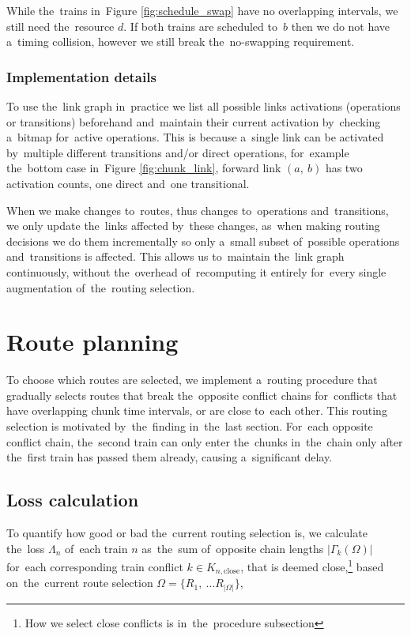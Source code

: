 \begin{remark}
While the~trains in~Figure \ref{fig:schedule_swap} have no overlapping intervals, we still need the~resource $d$. If both trains are scheduled to~$b$ then we do not have a~timing collision, however we still break the~no-swapping requirement.
\end{remark}

\subsubsection{Implementation details}
To use the~link graph in~practice we list all possible links activations (operations or transitions) beforehand and~maintain their current activation by~checking a~bitmap for~active operations. This is because a~single link can be activated by~multiple different transitions and/or direct operations, for~example the~bottom case in~Figure \ref{fig:chunk_link}, forward link $(a,\ b)$ has two activation counts, one direct and~one transitional.

When we make changes to~routes, thus changes to~operations and~transitions, we only update the~links affected by~these changes, as~when making routing decisions we do them incrementally so only a~small subset of~possible operations and~transitions is affected. This allows us to~maintain the~link graph continuously, without the~overhead of~recomputing it entirely for~every single augmentation of~the~routing selection.


\section{Route planning}
To choose which routes are selected, we implement a~routing procedure that gradually selects routes that break the~opposite conflict chains for~conflicts that have overlapping chunk time intervals, or are close to~each other. This routing selection is motivated by~the~finding in~the~last section. For~each opposite conflict chain, the~second train can only enter the~chunks in~the~chain only after the~first train has passed them already, causing a~significant delay.


\subsection{Loss calculation}
To quantify how good or bad the~current routing selection is, we calculate the~loss $\Lambda_n$ of~each train $n$ as~the~sum of~opposite chain lengths $|\Gamma_k(\Omega)|$ for~each corresponding train conflict $k \in K_{n,\mathrm{close}}$, that is deemed close,\footnote{How we select close conflicts is in~the~procedure subsection} based on~the~current route selection $\Omega = \{R_1,\ \dots R_{|\Omega|}\}$,


